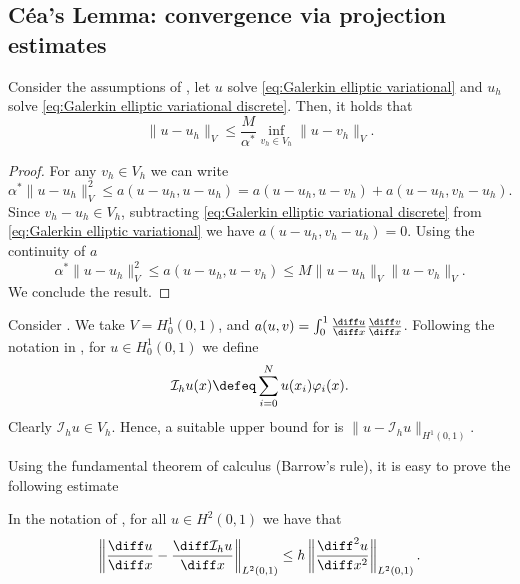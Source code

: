 \subsection{Céa's Lemma: convergence via projection estimates}

\begin{strongtheorem}
    \label{lem:cea}
    Consider the assumptions of ,
    let $u$ solve \eqref{eq:Galerkin elliptic variational} and $u_h$ solve \eqref{eq:Galerkin elliptic variational discrete}.
    Then, it holds that
    \begin{equation*}
        \| u - u_h \|_V \le \frac{M}{\alpha^*} \inf_{v_h \in V_h} \|u - v_h\|_V.
    \end{equation*}
\end{strongtheorem}

\begin{proof}
    For any $v_h \in V_h$ we can write
    \begin{equation*}
        \alpha^* \|u - u_h\|_V^2 \le a(u-u_h, u - u_h) = a(u - u_h, u - v_h) + a(u-u_h, v_h - u_h).
    \end{equation*}
    Since $v_h - u_h \in V_h$, subtracting \eqref{eq:Galerkin elliptic variational discrete} from \eqref{eq:Galerkin elliptic variational} we have $a(u-u_h, v_h - u_h) = 0$. Using the continuity of $a$
    \begin{equation*}
        \alpha^* \|u - u_h\|_V^2 \le a(u - u_h, u - v_h) \le M \| u - u_h \|_V \|u - v_h \|_V.
    \end{equation*}
    We conclude the result.
\end{proof}

\begin{example}
    \label{ex:piece-wise linear in d=1 interpolation}
    Consider .
    We take $V = H_0^1 (0,1)$, and $a(u,v) = \int_{0}^1 \frac{\diff u}{\diff x}\frac{\diff v}{\diff x}$.
    Following the notation in , for $u \in H^1_0 (0,1)$ we define
    \begin{equation}
        \mathcal I_h u (x) \defeq \sum_{i=0}^{N} u(x_i) \varphi_i(x).
    \end{equation}
    Clearly $\mathcal I_h u \in V_h$. Hence, a suitable upper bound for  is $\|u - \mathcal I_h u\|_{H^1(0,1)}$.
\end{example}

Using the fundamental theorem of calculus (Barrow's rule), it is easy to prove the following estimate
\begin{lemma}[Naive estimate of the error of the linear interpolation in $d=1$]
    \label{ex:Galerkin Laplace piecewise linear Cea naive}
    In the notation of , for all $u \in H^2(0,1)$ we have that
    \begin{equation*}
        \left\| \frac{\diff u}{\diff x} - \frac{\diff \mathcal I_h u}{\diff x} \right\|_{L^2(0,1)} \le h \left\| \frac{\diff^2u}{\diff x^2} \right\|_{L^2(0,1)}.
    \end{equation*}
\end{lemma}

